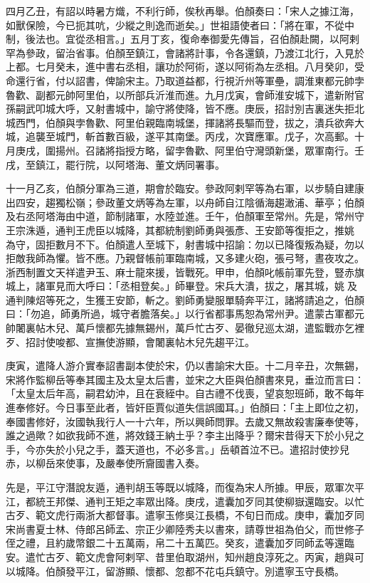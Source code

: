 \begin{pinyinscope}
 四月乙丑，有詔以時暑方熾，不利行師，俟秋再舉。伯顏奏曰：「宋人之據江海，如獸保險，今已扼其吭，少縱之則逸而逝矣。」世祖語使者曰：「將在軍，不從中制，後法也。宜從丞相言。」五月丁亥，復命奉御愛先傳旨，召伯顏赴闕，以阿剌罕為參政，留治省事。伯顏至鎮江，會諸將計事，令各還鎮，乃渡江北行，入見於上都。七月癸未，進中書右丞相，讓功於阿術，遂以阿術為左丞相。八月癸卯，受命還行省，付以詔書，俾諭宋主。乃取道益都，行視沂州等軍壘，調淮東都元帥孛魯歡、副都元帥阿里伯，以所部兵沂淮而進。九月戊寅，會師淮安城下，遣新附官孫嗣武叩城大呼，又射書城中，諭守將使降，皆不應。庚辰，招討別吉裏迷失拒北城西門，伯顏與孛魯歡、阿里伯親臨南城堡，揮諸將長驅而登，拔之，潰兵欲奔大城，追襲至城門，斬首數百級，遂平其南堡。丙戌，次寶應軍。戊子，次高郵。十月庚戌，圍揚州。召諸將指授方略，留孛魯歡、阿里伯守灣頭新堡，眾軍南行。壬戌，至鎮江，罷行院，以阿塔海、董文炳同署事。



 十一月乙亥，伯顏分軍為三道，期會於臨安。參政阿剌罕等為右軍，以步騎自建康出四安，趨獨松嶺；參政董文炳等為左軍，以舟師自江陰循海趨澉浦、華亭；伯顏及右丞阿塔海由中道，節制諸軍，水陸並進。壬午，伯顏軍至常州。先是，常州守王宗洙遁，通判王虎臣以城降，其都統制劉師勇與張彥、王安節等復拒之，推姚為守，固拒數月不下。伯顏遣人至城下，射書城中招諭：勿以已降復叛為疑，勿以拒敵我師為懼。皆不應。乃親督帳前軍臨南城，又多建火砲，張弓弩，晝夜攻之。浙西制置文天祥遣尹玉、麻士龍來援，皆戰死。甲申，伯顏叱帳前軍先登，豎赤旗城上，諸軍見而大呼曰：「丞相登矣。」師畢登。宋兵大潰，拔之，屠其城，姚及通判陳炤等死之，生獲王安節，斬之。劉師勇變服單騎奔平江，諸將請追之，伯顏曰：「勿追，師勇所過，城守者膽落矣。」以行省都事馬恕為常州尹。遣蒙古軍都元帥闍裏帖木兒、萬戶懷都先據無錫州，萬戶忙古歹、晏徹兒巡太湖，遣監戰亦乞裡歹、招討使唆都、宣撫使游顯，會闍裏帖木兒先趨平江。



 庚寅，遣降人游介實奉詔書副本使於宋，仍以書諭宋大臣。十二月辛丑，次無錫，宋將作監柳岳等奉其國主及太皇太后書，並宋之大臣與伯顏書來見，垂泣而言曰：「太皇太后年高，嗣君幼沖，且在衰絰中。自古禮不伐喪，望哀恕班師，敢不每年進奉修好。今日事至此者，皆奸臣賈似道失信誤國耳。」伯顏曰：「主上即位之初，奉國書修好，汝國執我行人一十六年，所以興師問罪。去歲又無故殺害廉奉使等，誰之過歟？如欲我師不進，將效錢王納土乎？李主出降乎？爾宋昔得天下於小兒之手，今亦失於小兒之手，蓋天道也，不必多言。」岳頓首泣不已。遣招討使抄兒赤，以柳岳來使事，及嚴奉使所齎國書入奏。



 先是，平江守潛說友遁，通判胡玉等既以城降，而復為宋人所據。甲辰，眾軍次平江，都統王邦傑、通判王矩之率眾出降。庚戌，遣囊加歹同其使柳嶽還臨安。以忙古歹、範文虎行兩浙大都督事。遣寧玉修吳江長橋，不旬日而成。庚申，囊加歹同宋尚書夏士林、侍郎呂師孟、宗正少卿陸秀夫以書來，請尊世祖為伯父，而世修子侄之禮，且約歲幣銀二十五萬兩，帛二十五萬匹。癸亥，遣囊加歹同師孟等還臨安。遣忙古歹、範文虎會阿剌罕、昔里伯取湖州，知州趙良淳死之。丙寅，趙與可以城降。伯顏發平江，留游顯、懷都、忽都不花屯兵鎮守。別遣寧玉守長橋。




\end{pinyinscope}
